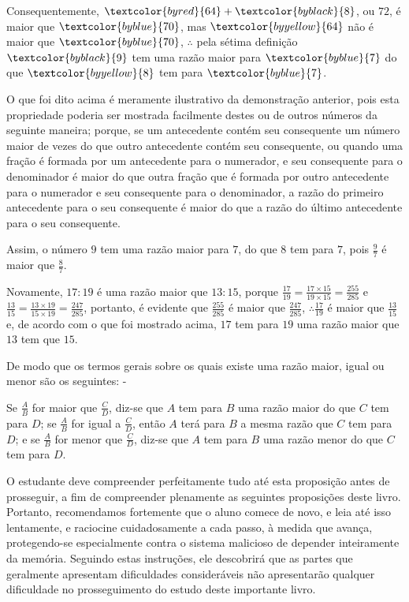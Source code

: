 \documentclass[booklanguage=brazilian]{byrnebook}
\begin{document}
Consequentemente, $\textcolor{byred}{64} + \textcolor{byblack}{8}$, ou $72$, é maior que $\textcolor{byblue}{70}$, mas $\textcolor{byyellow}{64}$ não é maior que $\textcolor{byblue}{70}$, $\therefore$ pela sétima definição $\textcolor{byblack}{9}$ tem uma razão maior para $\textcolor{byblue}{7}$ do que $\textcolor{byyellow}{8}$ tem para $\textcolor{byblue}{7}$.

O que foi dito acima é meramente ilustrativo da demonstração anterior, pois esta propriedade poderia ser mostrada facilmente destes ou de outros números da seguinte maneira; porque, se um antecedente contém seu consequente um número maior de vezes do que outro antecedente contém seu consequente, ou quando uma fração é formada por um antecedente para o numerador, e seu consequente para o denominador é maior do que outra fração que é formada por outro antecedente para o numerador e seu consequente para o denominador, a razão do primeiro antecedente para o seu consequente é maior do que a razão do último antecedente para o seu consequente.

Assim, o número $9$ tem uma razão maior para $7$, do que $8$ tem para $7$, pois $\frac{9}{7}$ é maior que $\frac{8}{7}$.

Novamente, $17 : 19$ é uma razão maior que $13 : 15$, porque $\frac{17}{19} = \frac{17 \times 15}{19 \times 15} = \frac{255}{285}$ e $\frac{13}{15} = \frac{13 \times 19}{15 \times 19} = \frac{247}{285}$, portanto, é evidente que $\frac{255}{285}$ é maior que $\frac{247}{285}$, $\therefore \frac{17}{19}$ é maior que $\frac{13}{15}$ e, de acordo com o que foi mostrado acima, $17$ tem para $19$ uma razão maior que $13$ tem que $15$.

De modo que os termos gerais sobre os quais existe uma razão maior, igual ou menor são os seguintes: -

Se $\frac{A}{B}$ for maior que $\frac{C}{D}$, diz-se que $A$ tem para $B$ uma razão maior do que $C$ tem para $D$; se $\frac{A}{B}$ for igual a $\frac{C}{D}$, então $A$ terá para $B$ a mesma razão que $C$ tem para $D$; e se $\frac{A}{B}$ for menor que $\frac{C}{D}$, diz-se que $A$ tem para $B$ uma razão menor do que $C$ tem para $D$.

O estudante deve compreender perfeitamente tudo até esta proposição antes de prosseguir, a fim de compreender plenamente as seguintes proposições deste livro. Portanto, recomendamos fortemente que o aluno comece de novo, e leia até isso lentamente, e raciocine cuidadosamente a cada passo, à medida que avança, protegendo-se especialmente contra o sistema malicioso de depender inteiramente da memória. Seguindo estas instruções, ele descobrirá que as partes que geralmente apresentam dificuldades consideráveis ​​não apresentarão qualquer dificuldade no prosseguimento do estudo deste importante livro.
\end{document}
